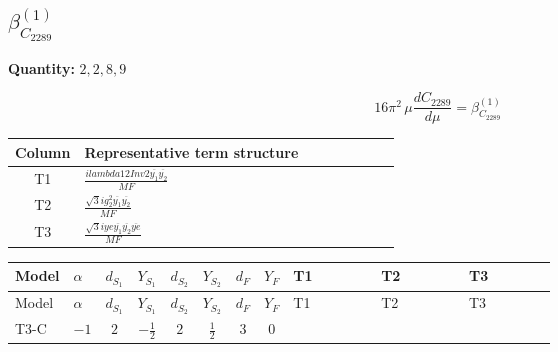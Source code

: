 \documentclass[8pt]{article}
\begin{document}
\begin{landscape}
\section*{$\beta_{C_{2289}}^{(1)}$}
\noindent\textbf{Quantity: }$\mathrm{2,2,8,9}$\par\smallskip
\[16\pi^2\,\mu\frac{d C_{2289}}{d\mu}=\beta_{C_{2289}}^{(1)}\]
\begin{center}
\begin{tabular}{@{}c >{\raggedright\arraybackslash}p{0.82\linewidth}@{}}
\toprule
Column & Representative term structure \\
\midrule
T1 & \(\displaystyle \frac{i lambda12Inv2 \overline{y_{1}} \overline{y_{2}}}{MF}\) \\
\midrule
T2 & \(\displaystyle \frac{\sqrt{3} i g_{2}^{2} \overline{y_{1}} \overline{y_{2}}}{MF}\) \\
\midrule
T3 & \(\displaystyle \frac{\sqrt{3} i ye \overline{y_{1}} \overline{y_{2}} \overline{ye}}{MF}\) \\
\midrule
\bottomrule
\end{tabular}
\end{center}
\smallskip
\tiny
\begin{longtable}{@{}llcccccc >{\raggedright\arraybackslash}p{0.21\linewidth} >{\raggedright\arraybackslash}p{0.21\linewidth} >{\raggedright\arraybackslash}p{0.21\linewidth}@{}}
\toprule
Model & $\alpha$ & $d_{S_1}$ & $Y_{S_1}$ & $d_{S_2}$ & $Y_{S_2}$ & $d_F$ & $Y_F$ & T1 & T2 & T3 \\
\midrule
\endfirsthead
\toprule
Model & $\alpha$ & $d_{S_1}$ & $Y_{S_1}$ & $d_{S_2}$ & $Y_{S_2}$ & $d_F$ & $Y_F$ & T1 & T2 & T3 \\
\midrule
\endhead
T3-C & $-1$ & $2$ & $-\frac{1}{2}$ & $2$ & $\frac{1}{2}$ & $3$ & $0$ & \scriptsize\adjustbox{max width=\linewidth}{$\begin{gathered} \frac{i lambda12Inv2 \overline{y_{1}} \overline{y_{2}}}{3 MF}\end{gathered}$} & \scriptsize\adjustbox{max width=\linewidth}{$\begin{gathered} \frac{\sqrt{3} i g_{2}^{2} \overline{y_{1}} \overline{y_{2}}}{4 MF}\end{gathered}$} & \scriptsize\adjustbox{max width=\linewidth}{$\begin{gathered} - \frac{\sqrt{3} i ye \overline{y_{1}} \overline{y_{2}} \overline{ye}}{12 MF}\end{gathered}$} \\
\midrule
\bottomrule
\end{longtable}
\clearpage

\end{landscape}
\end{document}
